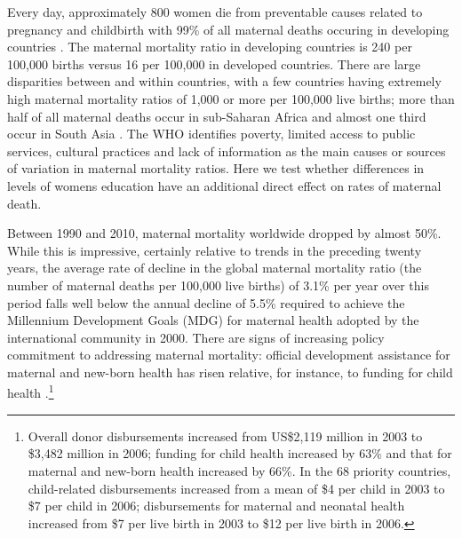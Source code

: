 \documentclass{article}[12pt,subeqn]
\begin{document}
\begin{spacing}{1.4}
Every day, approximately 800 women die from preventable causes related to 
pregnancy and childbirth with 99\% of all maternal deaths occuring in
developing countries \citep{WHO2012}. The maternal mortality ratio in developing
countries is 240 per 100,000 births versus 16 per 100,000 in developed countries.
There are large disparities between and within countries, with a few countries
having extremely high maternal mortality ratios of 1,000 or more per 100,000 live
births; more than half of all maternal deaths occur in sub-Saharan Africa and
almost one third occur in South Asia \citep{WHO2012}. The WHO identifies poverty,
limited access to public services, cultural practices and lack of information as
the main causes or sources of variation in maternal mortality ratios.  Here we
test whether differences in levels of womens education have an additional
direct effect on rates of maternal death.

Between 1990 and 2010, maternal mortality worldwide dropped by almost 50\%. 
While this is impressive, certainly relative to trends in the preceding twenty 
years, the average rate of decline in the global maternal mortality ratio (the 
number of maternal deaths per 100,000 live births) of 3.1\% per year over this 
period falls well below the annual decline of 5.5\% required to achieve the 
Millennium Development Goals (MDG) for maternal health adopted by the 
international community in 2000. There are signs of increasing policy commitment 
to addressing maternal mortality: official development assistance for maternal 
and new-born health has risen relative, for instance, to funding for child 
health \citep{Grecoetal2008}.\footnote{Overall donor disbursements increased from 
US\$2,119 million in 2003 to \$3,482 million in 2006; funding for child
health increased by 63\% and that for maternal and new-born health increased by 
66\%. In the 68 priority countries, child-related disbursements increased from a 
mean of \$4 per child in 2003 to \$7 per child in 2006; disbursements for 
maternal and neonatal health increased from \$7 per live birth in 2003 to \$12 
per live birth in 2006.}


\end{spacing}
\end{document}
